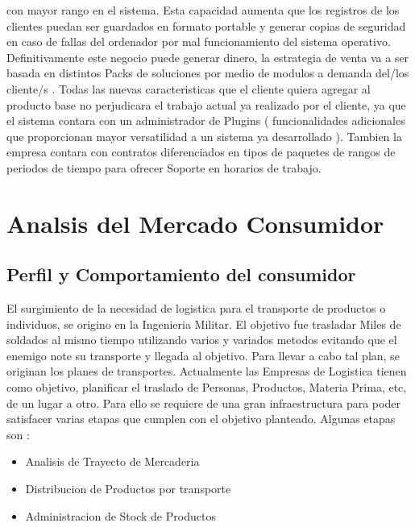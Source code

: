 \documentclass[
10pt, %
a4paper, %
oneside, %
headinclude,footinclude, %
BCOR5mm, %
]{scrartcl}
\begin{document}
con mayor rango en el sistema. Esta capacidad aumenta que los registros
de los clientes puedan ser guardados en formato portable y generar copias de
seguridad en caso de fallas del ordenador por mal funcionamiento del
sistema operativo.
\newline\newline
Definitivamente este negocio puede generar dinero, la estrategia de venta
va a ser basada en distintos Packs de soluciones por medio de modulos
a demanda del/los cliente/s . Todas las nuevas caracteristicas que el cliente
quiera agregar al producto base no perjudicara el trabajo actual ya realizado
por el cliente, ya que el sistema contara con un administrador de
Plugins ( funcionalidades adicionales que proporcionan mayor versatilidad a un
sistema ya desarrollado ).
\newline\newline
Tambien la empresa contara con contratos diferenciados en tipos de paquetes de
rangos de periodos de tiempo para ofrecer Soporte en horarios de trabajo.

\section {Analsis del Mercado Consumidor}
\subsection {Perfil y Comportamiento del consumidor}
  El surgimiento de la necesidad de logistica para el transporte de
  productos o individuos, se origino en la Ingenieria Militar.
  El objetivo fue trasladar Miles de soldados al mismo tiempo utilizando
  varios y variados metodos evitando que el enemigo note su transporte
  y llegada al objetivo.
  Para llevar a cabo tal plan, se originan los planes de transportes.
  \newline\newline
  Actualmente las Empresas de Logistica tienen como objetivo, planificar el
  traslado de Personas, Productos, Materia Prima, etc, de un lugar a otro.
  Para ello se requiere de una gran infraestructura para poder satisfacer
  varias etapas que cumplen con el objetivo planteado.
  \newline\newline
  Algunas etapas son :
  \begin{itemize}
    \item  Analisis de Trayecto de Mercaderia
    \item  Distribucion de Productos por transporte
    \item  Administracion de Stock de Productos
  \end{itemize}
\end{document}
